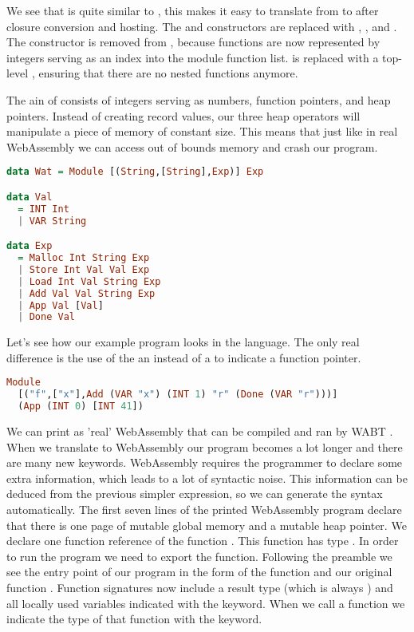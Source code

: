 {We see that  is quite similar to , this makes it easy to translate from  to  after closure conversion and hosting. The  and  constructors are replaced with , , and . The  constructor is removed from , because functions are now represented by integers serving as an index into the module function list.  is replaced with a top-level , ensuring that there are no nested functions anymore.

The ain of  consists of integers serving as numbers, function pointers, and heap pointers. Instead of creating record values, our three heap operators will manipulate a piece of memory of constant size. This means that just like in real WebAssembly we can access out of bounds memory and crash our program.

\begin{lstlisting}[language=Haskell]
data Wat = Module [(String,[String],Exp)] Exp

data Val
  = INT Int
  | VAR String

data Exp
  = Malloc Int String Exp
  | Store Int Val Val Exp
  | Load Int Val String Exp
  | Add Val Val String Exp
  | App Val [Val]
  | Done Val
\end{lstlisting}

Let's see how our example program looks in the  language. The only real difference is the use of the an  instead of a  to indicate a function pointer.

\begin{lstlisting}[language=Haskell]
Module 
  [("f",["x"],Add (VAR "x") (INT 1) "r" (Done (VAR "r")))]
  (App (INT 0) [INT 41])
\end{lstlisting}

We can print  as 'real' WebAssembly that can be compiled and ran by WABT \autocite{wabt}. When we translate to WebAssembly our program becomes a lot longer and there are many new keywords. WebAssembly requires the programmer to declare some extra information, which leads to a lot of syntactic noise. This information can be deduced from the previous simpler  expression, so we can generate the syntax automatically. The first seven lines of the printed WebAssembly program declare that there is one page of mutable global memory and a mutable heap pointer. We declare one function reference of the function . This function has type . In order to run the program we need to export the  function. Following the preamble we see the entry point of our program in the form of the function  and our original function . Function signatures now include a result type (which is always ) and all locally used variables indicated with the  keyword. When we call a function we indicate the type of that function with the  keyword.

}
